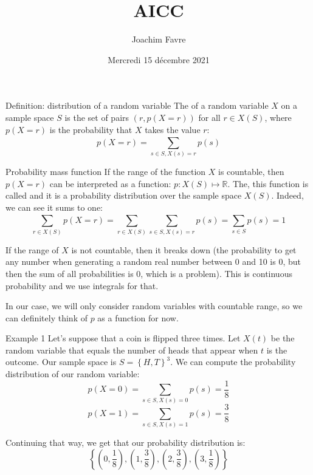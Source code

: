 \documentclass[a4paper]{article}
\title{AICC}
\author{Joachim Favre}
\date{Mercredi 15 décembre 2021}
\begin{document}
\maketitle


\begin{parag}{Definition: distribution of a random variable}
    The  of a random variable $X$ on a sample space $S$ is the set of pairs $\left(r, p\left(X = r\right)\right)$ for all $r \in X\left(S\right)$, where $p\left(X = r\right)$ is the probability that $X$ takes the value $r$: 
    \[p\left(X = r\right) = \sum_{s \in S, X\left(s\right) = r}^{} p\left(s\right)\]

    \begin{subparag}{Probability mass function}
        If the range of the function $X$ is countable, then $p\left(X = r\right)$ can be interpreted as a function: $p : X\left(S\right) \mapsto \mathbb{R}$. The, this function is called  and it is a probability distribution over the sample space $X\left(S\right)$. Indeed, we can see it sums to one:
        \[\sum_{r \in X\left(S\right)}^{} p\left(X = r\right) = \sum_{r \in X\left(S\right)}^{} \sum_{s \in S, X\left(s\right) = r}^{} p\left(s\right) = \sum_{s \in S}^{} p\left(s\right) = 1\]

        If the range of $X$ is not countable, then it breaks down (the probability to get any number when generating a random real number between 0 and 10 is $0$, but then the sum of all probabilities is 0, which is a problem). This is continuous probability and we use integrals for that.

        In our case, we will only consider random variables with countable range, so we can definitely think of $p$ as a function for now.
    \end{subparag}
\end{parag}

\begin{parag}{Example 1}
    Let's suppose that a coin is flipped three times. Let $X\left(t\right)$ be the random variable that equals the number of heads that appear when $t$ is the outcome. Our sample space is $S = \left\{H, T\right\}^3$. We can compute the probability distribution of our random variable: 
    \[p\left(X = 0\right) = \sum_{s \in S, X\left(s\right) = 0}^{} p\left(s\right) = \frac{1}{8}\]
    \[p\left(X = 1\right) = \sum_{s \in S, X\left(s\right) = 1}^{} p\left(s\right) = \frac{3}{8}\]
    
    Continuing that way, we get that our probability distribution is: 
    \[\left\{\left(0, \frac{1}{8}\right), \left(1, \frac{3}{8}\right), \left(2, \frac{3}{8}\right), \left(3, \frac{1}{8}\right)\right\}\]
\end{parag}
\end{document}
